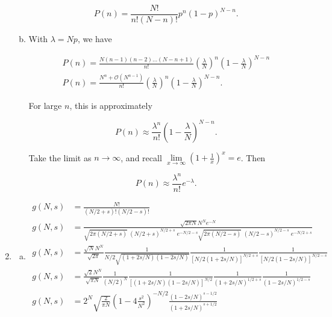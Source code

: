\documentclass{article}
\begin{document}
\begin{enumerate}
\begin{enumerate}[(a)]
	$$P(n) = \frac{N!}{n!(N-n)!} p^n(1-p)^{N-n}.$$

	\item

	With $\lambda = Np$, we have 

	\begin{align*}
	P(n) = \frac{N(n-1)(n-2)\ldots(N-n+1)}{n!} \left(\frac{\lambda}{N}\right)^n \left(1-\frac{\lambda}{N}\right)^{N-n} \\
	P(n) = \frac{N^n + \mathcal{O}(N^{n-1})}{n!} \left(\frac{\lambda}{N}\right)^n \left(1-\frac{\lambda}{N}\right)^{N-n}.
	\end{align*}

	For large $n$, this is approximately

	\begin{equation*}
	P(n) \approx \frac{\lambda^n}{n!} \left(1-\frac{\lambda}{N}\right)^{N-n}.
	\end{equation*}

	Take the limit as $n \to \infty$, and recall $\lim \limits_{x\to\infty} (1 + \frac{1}{x})^x = e$. Then

	\begin{equation*}
	P(n) \approx \frac{\lambda^n}{n!} e^{-\lambda}.
	\end{equation*}

	\end{enumerate}

\item

	\begin{enumerate}[(a)]

	\item

	\begin{align*}
	g(N,s) &= \frac{N!}{(N/2+s)! (N/2-s)!} \\
	g(N,s) &= \frac{\sqrt{2\pi N}N^N e^{-N}}{ \sqrt{2 \pi (N/2 + s)} \; (N/2+s)^{N/2+s} \; e^{-N/2-s} \sqrt{2 \pi (N/2 - s)} \; (N/2-s)^{N/2-s} \; e^{-N/2+s}} \\
	g(N,s) &= \frac{\sqrt{N}N^N}{\sqrt{2 \pi}} \frac{1}{N/2 \sqrt{(1+2s/N)(1-2s/N)}} \frac{1}{[N/2(1+2s/N)]^{N/2+s}} \frac{1}{[N/2(1-2s/N)]^{N/2-s}} \\
	g(N,s) &= \frac{\sqrt{2}N^N}{\sqrt{\pi N}} \frac{1}{(N/2)^N} \frac{1}{[(1 + 2s/N)(1 - 2s/N)]^{N/2}} \frac{1}{(1 + 2s/N)^{1/2 + s}} \frac{1}{(1 - 2s/N)^{1/2 - s}} \\
	g(N,s) &= 2^N \sqrt{\frac{2}{\pi N}} \left(1 - 4\frac{s^2}{N^2}\right)^{-N/2} \frac{(1-2s/N)^{s-1/2}}{(1+2s/N)^{s+1/2}}
	\end{align*}


\end{enumerate}
\end{enumerate}
\end{document}
